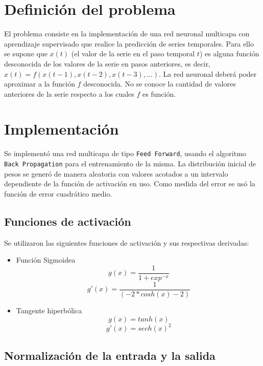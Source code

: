 \documentclass[a4paper,10pt]{article}
\begin{document}
\setcounter{page}{1}


\section{Definición del problema}

El problema consiste en la implementación de una red neuronal multicapa con aprendizaje supervisado que realice la predicción de series temporales. Para ello se supone que $x(t)$ (el valor de la 
serie en el paso temporal $t$) es alguna función desconocida de los valores de la serie en pasos anteriores, es decir, $x(t) = f (x(t - 1), x(t - 2), x(t - 3), \dots)$. 
La red neuronal deberá poder aproximar a la función $f$ desconocida. No se
conoce la cantidad de valores anteriores de la serie respecto a los cuales $f$ es función.

\section{Implementación}

    Se implementó una red multicapa de tipo \texttt{Feed Forward}, usando el
    algoritmo \texttt{Back Propagation} para el entrenamiento de la misma.
    La distribución inicial de pesos se generó de manera aleatoria con valores
    acotados a un intervalo dependiente de la función de activación en uso.
    Como medida del error se usó la función de error cuadrático medio.

    \subsection{Funciones de activación}
    Se utilizaron las siguientes funciones de activación y sus respectivas derivadas:

    \begin{itemize}
        \item Función Sigmoidea
            \[ g(x) = \dfrac{1}{1 + exp^{-x}} \]
            \[ g'(x) = \dfrac{1}{(-2 * cosh(x) - 2)}\]
        \item Tangente hiperbólica
            \[ g(x) = tanh(x) \]
            \[ g'(x) = sech(x)^{2} \]
    \end{itemize}

    \subsection{Normalización de la entrada y la salida}
\end{document}
